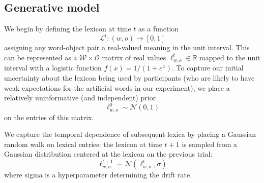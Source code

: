 \documentclass[10pt,letterpaper]{article}
\begin{document}
\subsection{Generative model}

We begin by defining the lexicon at time $t$ as a function 
$$\mathcal{L}^{t} : (w, o) \rightarrow [0,1]$$ 
assigning any word-object pair a real-valued meaning in the unit interval. This can be represented as a $\mathcal{W} \times \mathcal{O}$ matrix of real values $\ell_{w,o}^t \in \mathbb{R}$ mapped to the unit interval with a logistic function $f(x) = 1/(1 + e^{x})$. To capture our initial uncertainty about the lexicon being used by participants (who are likely to have weak expectations for the artificial words in our experiment), we place a relatively uninformative (and independent) prior $$\ell_{w,o}^0 \sim \mathcal{N}(0, 1)$$ on the entries of this matrix. 

We capture the temporal dependence of subsequent lexica by placing a Gaussian random walk on lexical entries: the lexicon at time $t+1$ is sampled from a Gaussian distribution centered at the lexicon on the previous trial: $$\ell_{w,o}^{t+1} \sim \mathcal{N}(\ell_{w,o}^t, \sigma)$$ where sigma is a hyperparameter determining the drift rate. 
\end{document}
